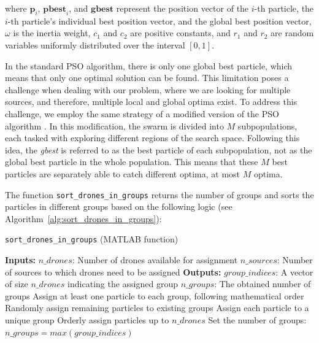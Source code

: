 where $\mathbf{p}_i$, $\mathbf{pbest}_i$, and $\mathbf{gbest}$ represent the position vector of the $i$-th particle, 
the $i$-th particle's individual best position vector, and the global best position vector, 
$\omega$ is the inertia weight, $c_1$ and $c_2$ are positive constants, and
$r_1$ and $r_2$ are random variables uniformly distributed over the interval $[0, 1]$.

\par In the standard PSO algorithm, there is only one global best particle, 
which means that only one optimal solution can be found. This limitation 
poses a challenge when dealing with our problem, where we are looking for multiple sources, 
and therefore, multiple local and global optima exist. To address this challenge, 
we employ the same strategy of a modified version of the PSO algorithm \cite{PSO_IMPORTANT}. 
In this modification, the swarm is divided into $M$ subpopulations, each tasked with exploring 
different regions of the search space. Following this idea, the \textit{gbest} is referred to as 
the best particle of each subpopulation, not as the global best particle in the whole population. 
This means that these $M$ best particles are separately able to catch different optima, at most $M$ optima.

\par The function \texttt{sort\_drones\_in\_groups} returns the number of groups and sorts the 
particles in different groups based on the following logic (see Algorithm~\ref{alg:sort_drones_in_groups}):
\begin{algorithm}[H]
    \caption{\texttt{sort\_drones\_in\_groups} (MATLAB function)}\label{alg:sort_drones_in_groups}
    \begin{algorithmic}[1]
    \State \textbf{Inputs:}
    \State $n\_drones$: Number of drones available for assignment
    \State $n\_sources$: Number of sources to which drones need to be assigned
    \State \textbf{Outputs:}
    \State $group\_indices$: A vector of size $n\_drones$ indicating the assigned group
    \State $n\_groups$: The obtained number of groups
        \State Assign at least one particle to each group, following mathematical order
        \State Randomly assign remaining particles to existing groups
        \State Assign each particle to a unique group
    \Else
        \State Orderly assign particles up to $n\_drones$
    \EndIf
    \State Set the number of groups: $n\_groups = max(group\_indices)$
    \end{algorithmic}
\end{algorithm}

